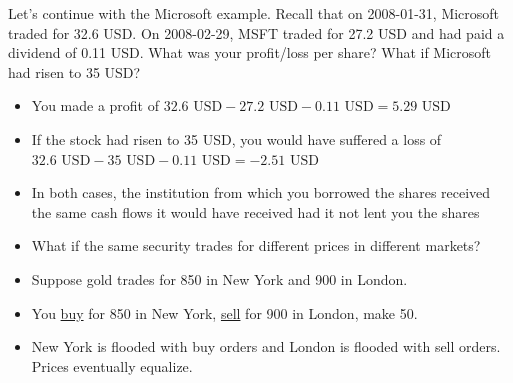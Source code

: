 \documentclass{beamer}
\begin{document}
\begin{frame}{}
	\small
	Let's continue with the Microsoft example. Recall that on 2008-01-31, Microsoft traded for 32.6 USD. On 2008-02-29, MSFT traded for 27.2 USD and had paid a dividend of 0.11 USD. What was your profit/loss per share? What if Microsoft had risen to 35 USD?

	\pause
	\begin{itemize}
		\item {\color{blue} You made a profit of $32.6\text{ USD}-27.2\text{ USD}-0.11\text{ USD}=5.29\text{ USD}$}
		\item {\color{blue} If the stock had risen to 35 USD, you would have suffered a loss of $32.6\text{ USD}-35\text{ USD}-0.11\text{ USD}=-2.51\text{ USD}$}
		\item {\color{blue}In both cases, the institution from which you borrowed the shares received the same cash flows it would have received had it not lent you the shares}
	\end{itemize}
\end{frame}

\begin{frame}{}
\begin{itemize}
\item What if the same security trades for different prices in different markets?
\item Suppose gold trades for 850 in New York and 900 in London.
\item You \underline{buy} for 850 in New York, \underline{sell} for 900 in London, make 50. 
\item New York is flooded with buy orders and London is flooded with sell orders. Prices eventually equalize.
\end{itemize}
\end{frame}
\end{document}
